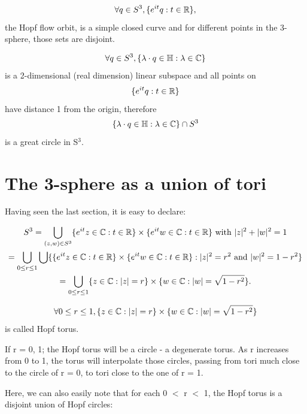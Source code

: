 \begin{equation*}
\forall q \in S^3, \{ e^{it}q : t \in \mathbb{R} \},    
\end{equation*}
the Hopf flow orbit, is a simple closed curve and for different points in the 3-sphere, those sets are disjoint. %

\begin{equation*}
\forall q \in S^3, \{ \lambda \cdot q \in \mathbb{H} : \lambda \in \mathbb{C} \}    
\end{equation*}
is a 2-dimensional (real dimension) linear subspace and all points on
\begin{equation*}
\{ e^{it}q : t \in \mathbb{R} \}    
\end{equation*}
have distance 1 from the origin, therefore 
\begin{equation*}
\{ \lambda \cdot q \in \mathbb{H} : \lambda \in \mathbb{C} \} \cap S^3    
\end{equation*}
is a great circle in S$^3$.


\section{The 3-sphere as a union of tori}
Having seen the last section, it is easy to declare:

\begin{gather*}
S^3 = \bigcup\limits_{(z,w) \in S^3} \{ e^{it}z \in \mathbb{C} : t \in \mathbb{R} \} \times \{ e^{it}w \in \mathbb{C}: t \in \mathbb{R} \} \mbox{ with } |z|^2 + |w|^2 = 1 \\
= \bigcup\limits_{0 \leq r \leq 1} \bigcup \{\{ e^{it}z \in \mathbb{C} : t \in \mathbb{R} \} \times \{ e^{it}w \in \mathbb{C}: t \in \mathbb{R} \} : |z|^2 = r^2 \mbox{ and } |w|^2 = 1-r^2\} \\
= \bigcup\limits_{0 \leq r \leq 1} \{ z \in \mathbb{C} : |z| = r \} \times \{ w \in \mathbb{C} : |w| = \sqrt{1-r^2} \}. \\
\end{gather*}

\begin{equation*}
 \forall 0 \leq r \leq 1, \{ z \in \mathbb{C} : |z| = r \} \times \{ w \in \mathbb{C} : |w| = \sqrt{1-r^2} \}
\end{equation*}
is called Hopf torus.

If r = 0, 1; the Hopf torus will be a circle - a degenerate torus.
As r increases from 0 to 1, the torus will interpolate those circles, passing from tori much close to the circle of r = 0, to tori close to the one of r = 1.

Here, we can also easily note that for each 0 $<$ r $<$ 1, the Hopf torus is a disjoint union of Hopf circles:


